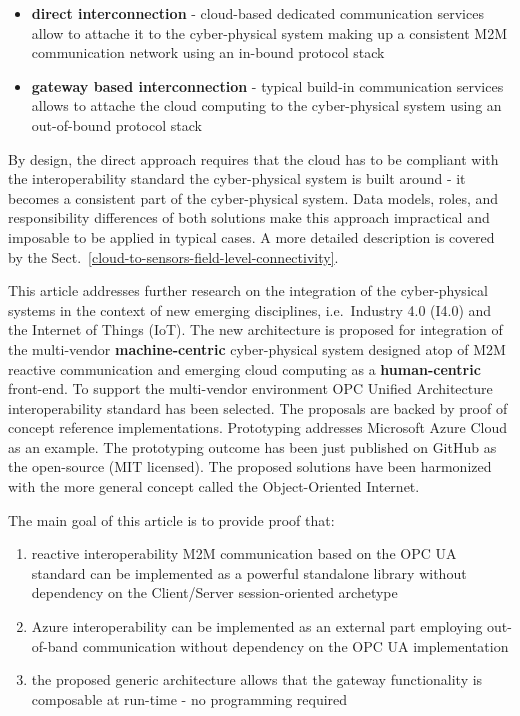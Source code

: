 \documentclass{jacsart}
\providecommand{\tightlist} { \setlength{\itemsep}{0pt}\setlength{\parskip}{0pt}}
\begin{document}
\begin{itemize}
  \tightlist
  \item
        \textbf{direct interconnection} - cloud-based dedicated communication
        services allow to attache it to the cyber-physical system making up a
        consistent M2M communication network using an in-bound protocol stack
  \item
        \textbf{gateway based interconnection} - typical build-in
        communication services allows to attache the cloud computing to the
        cyber-physical system using an out-of-bound protocol stack
\end{itemize}

By design, the direct approach requires that the cloud has to be
compliant with the interoperability standard the cyber-physical system
is built around - it becomes a consistent part of the cyber-physical
system. Data models, roles, and responsibility differences of both
solutions make this approach impractical and imposable to be applied in
typical cases. A more detailed description is covered by the Sect.~\ref*{cloud-to-sensors-field-level-connectivity}.

This article addresses further research on the integration of the
cyber-physical systems in the context of new emerging disciplines,
i.e.~Industry 4.0 (I4.0) and the Internet of Things (IoT). The new
architecture is proposed for integration of the multi-vendor
\textbf{machine-centric} cyber-physical system designed atop of M2M
reactive communication and emerging cloud computing as a
\textbf{human-centric} front-end. To support the multi-vendor
environment OPC Unified Architecture interoperability standard has been
selected. The proposals are backed by proof of concept reference
implementations. Prototyping addresses Microsoft Azure Cloud as an
example. The prototyping outcome has been just published on GitHub as
the open-source (MIT licensed). The proposed solutions have been
harmonized with the more general concept called the Object-Oriented
Internet.

The main goal of this article is to provide proof that:

\begin{enumerate}
  \def\labelenumi{\arabic{enumi}.}
  \tightlist
  \item
        reactive interoperability M2M communication based on the OPC UA
        standard can be implemented as a powerful standalone library without
        dependency on the Client/Server session-oriented archetype
  \item
        Azure interoperability can be implemented as an external part
        employing out-of-band communication without dependency on the OPC UA
        implementation
  \item
        the proposed generic architecture allows that the gateway
        functionality is composable at run-time - no programming required
\end{enumerate}
\end{document}
